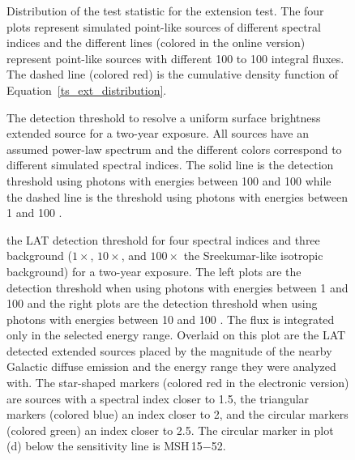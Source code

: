 \documentclass[12pt,preprint]{aastex}
\newif\ifcolorfigure
\newcommand{\mev}{\text{MeV}\xspace}
\newcommand{\gev}{\text{GeV}\xspace}
\begin{document}
\clearpage
\begin{figure}
    \ifcolorfigure
    \plotone{mc_plots/ts_ext_emin_1000_color.eps}
    \else
    \fi
    \caption{
    Distribution of the test statistic for the extension test.
    The four plots
    represent simulated point-like sources of different spectral indices and
    the different lines (colored in the online version) 
    represent point-like sources with different 100 \mev
    to 100 \gev integral fluxes.  The dashed line (colored red)
    is the cumulative
    density function of Equation~\ref{ts_ext_distribution}.
    }\label{ts_ext_mc}
  \end{figure}



\clearpage
\begin{figure}
    \ifcolorfigure
    \plotone{mc_plots/index_sensitivity_color.eps}
    \else
    \fi
    \caption{
    The detection threshold to resolve a
    uniform surface brightness extended source for a two-year exposure.  All sources
    have an assumed power-law spectrum and the different colors correspond
    to different simulated spectral indices.  The solid line is the
    detection threshold using photons with energies between 100 \mev and 100
    \gev while the dashed line is the threshold using 
     photons with energies between 1 \gev and 100 \gev.
    }\label{index_sensitivity}
  \end{figure}

\clearpage
\begin{figure}
    \ifcolorfigure
    \plotone{mc_plots/all_sensitivity_color.eps}
    \else
    \fi
    \caption{the LAT detection threshold for four spectral indices
    and three background ($1\times$, $10\times$, and $100\times$ the
    Sreekumar-like isotropic background) for a two-year exposure. The
    left plots are the detection threshold when using 
    photons with energies between
    1 \gev and 100 \gev
    and the right plots are the detection threshold when using
    photons with energies between
    10 \gev and 100 \gev.  The flux is integrated only in the
    selected energy range.  Overlaid on this plot are the LAT detected
    extended sources placed by the magnitude of the nearby Galactic
    diffuse emission and the energy range they were analyzed with.
    The star-shaped markers (colored red in the electronic version)
    are sources with a spectral index closer to 1.5, the triangular
    markers (colored blue) an index closer to 2, and the circular markers
    (colored green) an index closer to 2.5.  The circular marker in plot
    (d) below the sensitivity line is MSH\,15$-$52.
    }\label{all_sensitivity} 
  \end{figure}
\end{document}
